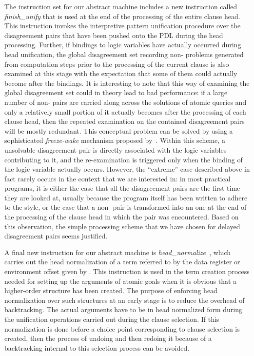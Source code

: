The instruction set for our abstract machine includes a new
instruction called {\it finish\_unify} that is used at the end
of the processing of the entire clause head. This instruction invokes
the interpretive
pattern unification procedure over the disagreement pairs that have been
pushed onto the PDL during the head processing. Further, if bindings to logic
variables have actually occurred during head unification,
the global disagreement set recording non- problems generated
from computation steps prior to the processing of the current clause is also
examined at this stage with the expectation that some of them could actually
become  after the bindings.
It is interesting to note that this way of examining the global disagreement
set could in theory lead to bad performance: if a large number of non-
pairs are carried along across the solutions of atomic queries and only a
relatively small portion of it actually becomes  after the processing
of each clause head, then the repeated examination on the contained
disagreement pairs will be mostly redundant. This conceptual problem can be
solved by using a sophisticated {\it freeze-wake} mechanism proposed
by~\cite{MP93ppcp}. Within this scheme, a unsolvable disagreement pair
is directly associated with the logic variables contributing to it, and
the re-examination is triggered only when the binding of the logic
variable actually occurs. However, the ``extreme'' case described
above in fact rarely occurs in the context that we are interested in: in most
practical  programs, it is either the case that
all the disagreement pairs are  the first time they are looked
at, usually because the program itself has been written to adhere to
the  style, or the case that a non- pair is
transformed into an  one at the end of the processing of the
clause head in which the pair was encountered.
Based on this observation, the simple processing scheme that we have
chosen for delayed disagreement pairs seems justified.

A final new instruction for our abstract machine is
{\it head\_normalize\ }, which carries out the head normalization of a
term referred to by the data register or
environment offset given by . This instruction is used in the term
creation process
needed for setting up the arguments of atomic goals when it is obvious that a
higher-order structure
has been created. The purpose of enforcing head normalization over such
structures at an early stage is to reduce the overhead of backtracking.
The actual arguments have to be in head normalized form
during the unification operations carried out during the clause
selection. If this normalization is done before a choice point
corresponding to clause selection is created, then the process of
undoing and then redoing it because of a backtracking internal to this
selection process can be avoided.

